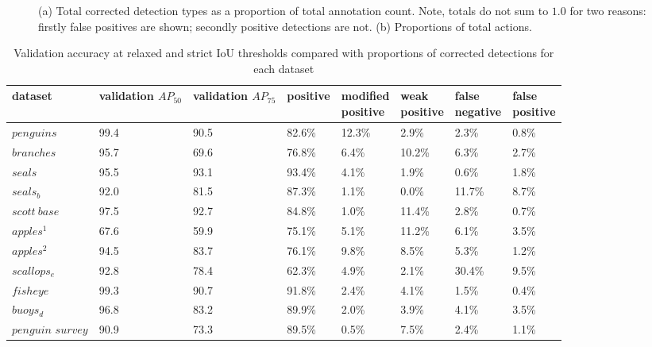 \begin{figure}[ht!]
\caption {(a) Total corrected detection types as a proportion of total annotation count. Note, totals do not sum to $1.0$ for two reasons: firstly false positives are shown; secondly positive detections are not. (b) Proportions of total actions. }
\label{fig:actions_dataset}
\end{figure}

\begin{table}[h!]
\caption{Validation accuracy at relaxed and strict IoU thresholds compared with proportions of corrected detections for each dataset}
\label{tab:validation_corrections}
\begin{adjustbox}{max width=\textwidth}
\begin{tabular}{llllllll}
dataset           & \shortstack{validation \\ $AP_{50}$} & \shortstack{validation  \\ $AP_{75}$} & positive & \shortstack{modified\\ positive} & \shortstack{weak\\ positive} & \shortstack{false \\ negative} & \shortstack{false \\ positive} \\
\toprule
$penguins$        & 99.4      & 90.5      & 82.6\%   & 12.3\%            & 2.9\%         & 2.3\%          & 0.8\%          \\
$branches$        & 95.7      & 69.6      & 76.8\%   & 6.4\%             & 10.2\%        & 6.3\%          & 2.7\%          \\
$seals$           & 95.5      & 93.1      & 93.4\%   & 4.1\%             & 1.9\%         & 0.6\%          & 1.8\%          \\
$seals_b$         & 92.0      & 81.5      & 87.3\%   & 1.1\%             & 0.0\%         & 11.7\%         & 8.7\%          \\
$scott\:base$     & 97.5      & 92.7      & 84.8\%   & 1.0\%             & 11.4\%        & 2.8\%          & 0.7\%          \\
$apples^1$        & 67.6      & 59.9      & 75.1\%   & 5.1\%             & 11.2\%        & 6.1\%          & 3.5\%          \\
$apples^2$        & 94.5      & 83.7      & 76.1\%   & 9.8\%             & 8.5\%         & 5.3\%          & 1.2\%          \\
$scallops_e$      & 92.8      & 78.4      & 62.3\%   & 4.9\%             & 2.1\%         & 30.4\%         & 9.5\%          \\
$fisheye$         & 99.3      & 90.7      & 91.8\%   & 2.4\%             & 4.1\%         & 1.5\%          & 0.4\%          \\
$buoys_d$         & 96.8      & 83.2      & 89.9\%   & 2.0\%             & 3.9\%         & 4.1\%          & 3.5\%          \\
\shortstack {$penguin$ \\ $survey$} & 90.9      & 73.3      & 89.5\%   & 0.5\%             & 7.5\%         & 2.4\%          & 1.1\%        \\ 
\bottomrule
\end{tabular}
\end{adjustbox}
\end{table}

